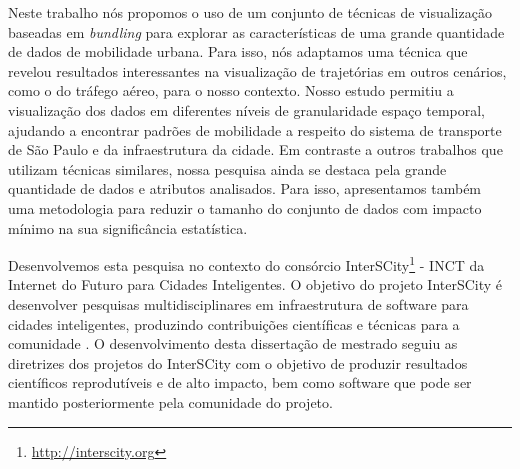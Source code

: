 Neste trabalho nós propomos o uso de um conjunto de técnicas de visualização
baseadas em \emph{bundling} para explorar as características de uma grande
quantidade de dados de mobilidade urbana. Para isso, nós adaptamos uma técnica
que revelou resultados interessantes na visualização de trajetórias em outros
cenários, como o do tráfego aéreo, para o nosso contexto. Nosso estudo permitiu
a visualização dos dados em diferentes níveis de granularidade espaço temporal,
ajudando a encontrar padrões de mobilidade a respeito do sistema de transporte
de S\~ao Paulo e da infraestrutura da cidade. Em contraste a outros trabalhos
que utilizam técnicas similares, nossa pesquisa ainda se destaca pela grande
quantidade de dados e atributos analisados. Para isso, apresentamos também uma
metodologia para reduzir o tamanho do conjunto de dados com impacto mínimo na
sua significância estatística.

Desenvolvemos esta pesquisa no contexto do consórcio
InterSCity\footnote{\url{http://interscity.org}} - INCT da Internet do Futuro
para Cidades Inteligentes. O objetivo do projeto InterSCity é desenvolver
pesquisas multidisciplinares em infraestrutura de software para cidades
inteligentes, produzindo contribuições científicas e técnicas para a comunidade
\citep{Daniel2016}. O desenvolvimento desta dissertação de mestrado seguiu as
diretrizes dos projetos do InterSCity com o objetivo de produzir resultados
científicos reprodutíveis e de alto impacto, bem como software 
que pode ser mantido posteriormente pela comunidade do projeto.
